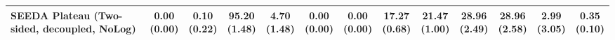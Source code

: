 \begin{table}[H]
{\begin{tabular}{l|cccccc|cccccc}
SEEDA Plateau (Two-sided, decoupled, NoLog) & \makecell{0.00 \\ (0.00)} & \makecell{0.10 \\ (0.22)} & {\cellcolor[HTML]{C8E6C9}} \bfseries \makecell{95.20 \\ (1.48)} & \makecell{4.70 \\ (1.48)} & \makecell{0.00 \\ (0.00)} & \makecell{0.00 \\ (0.00)} & \makecell{17.27 \\ (0.68)} & \makecell{21.47 \\ (1.00)} & {\cellcolor[HTML]{C8E6C9}} \bfseries \makecell{28.96 \\ (2.49)} & \makecell{28.96 \\ (2.58)} & \makecell{2.99 \\ (3.05)} & \makecell{0.35 \\ (0.10)} \\
\bottomrule
\end{tabular}
}%
\end{table}
